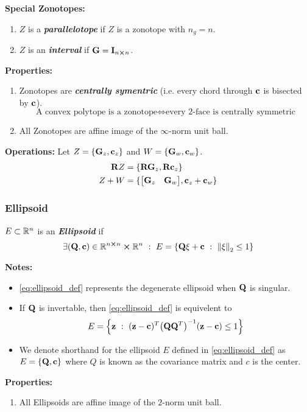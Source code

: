 \textbf{Special Zonotopes:}
\begin{enumerate}
    \item $Z$ is a \emph{\textbf{parallelotope}} if $Z$ is a zonotope with $n_g = n$.
    \item $Z$ is an \emph{\textbf{interval}} if $\vb{G} = \vb{I}_{n \cross n}$.
\end{enumerate}

\textbf{Properties:}
\begin{enumerate}
    \item Zonotopes are \emph{\textbf{centrally symentric}}
    (i.e. every chord through $\vb{c}$ is bisected by $\vb{c}$).\[
        \text{A convex polytope is a zonotope} \iff \text{every 2-face is centrally symmetric}
    \]
    \item All Zonotopes are affine image of the $\infty$-norm unit ball.
\end{enumerate}

\textbf{Operations:}
Let $Z = \{\vb{G}_z, \vb{c}_z\}$ and $W = \{\vb{G}_w, \vb{c}_w\}$.
\begin{align}
    \vb{R} Z &= \{\vb{R} \vb{G}_z, \vb{R} \vb{c}_z\}\\
    Z + W    &= \{\mqty[\vb{G}_z & \vb{G}_w], \vb{c}_z + \vb{c}_w\}
\end{align}

\subsubsection{Ellipsoid}
\begin{definition} \label{eq:ellipsoid_def}
    $E \subset \mathbb{R}^n$ is an \emph{\textbf{Ellipsoid}} if \begin{equation}
        \exists (\vb{Q}, \vb{c}) \in \mathbb{R}^{n \cross n} \cross \mathbb{R}^{n} \ : \  E = \{\vb{Q} \xi + \vb{c} \ : \  \norm{\xi}_2 \leq 1\}
    \end{equation}
\end{definition}

\textbf{Notes:}
\begin{itemize}
    \item \eqref{eq:ellipsoid_def} represents the degenerate ellipsoid when $\vb{Q}$ is singular.
    \item If $\vb{Q}$ is invertable, then \eqref{eq:ellipsoid_def} is equivelent to \[
        E = \qty{\vb{z} \ : \ (\vb{z} - \vb{c})^T \qty(\vb{Q} \vb{Q}^T)^{-1} (\vb{z} - \vb{c}) \leq 1}
    \]
    \item We denote shorthand for the ellipsoid $E$ defined in \eqref{eq:ellipsoid_def} as $E = \{\vb{Q}, \vb{c}\}$ where $Q$ is known as the covariance matrix and $c$ is the center.
\end{itemize}

\textbf{Properties:}
\begin{enumerate}
    \item All Ellipsoids are affine image of the $2$-norm unit ball.
\end{enumerate}